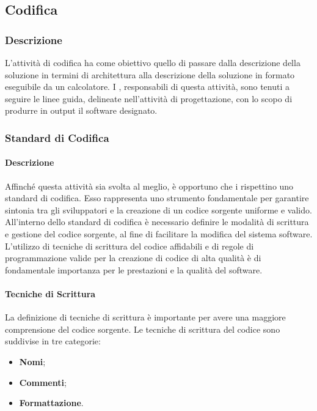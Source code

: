 \subsection{Codifica}

\subsubsection{Descrizione}
L'attività di codifica ha come obiettivo quello di passare dalla descrizione della soluzione in termini di architettura alla descrizione della soluzione in formato eseguibile da un calcolatore. I \textit{\Progrs}, responsabili di questa attività, sono tenuti a seguire le linee guida, delineate nell'attività di progettazione, con lo scopo di produrre in output il software designato. 

\subsubsection{Standard di Codifica}
\paragraph{Descrizione}
Affinché questa attività sia svolta al meglio, è opportuno che i \textit{\Progrs} rispettino uno standard di codifica.
Esso rappresenta uno strumento fondamentale per garantire sintonia tra gli sviluppatori e la creazione di un codice sorgente uniforme e valido.
All'interno dello standard di codifica è necessario definire le modalità di scrittura e gestione del codice sorgente, al fine di facilitare la modifica del sistema software.
L'utilizzo di tecniche di scrittura del codice affidabili e di regole di programmazione valide per la creazione di codice di alta qualità è di fondamentale importanza per le prestazioni e la qualità del software. 


\paragraph{Tecniche di Scrittura}
La definizione di tecniche di scrittura è importante per avere una maggiore comprensione del codice sorgente.
Le tecniche di scrittura del codice sono suddivise in tre categorie:
\begin{itemize} 
\item
\textbf{Nomi};
\item
\textbf{Commenti};
\item
\textbf{Formattazione}.
\end{itemize}

